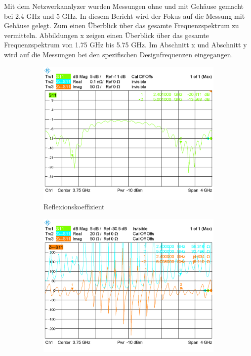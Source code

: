 Mit dem Netzwerkanalyzer wurden Messungen ohne und mit Gehäuse gemacht bei 2.4 GHz und 5 GHz. In diesem Bericht wird der Fokus  auf die Messung mit Gehäuse gelegt. Zum einen Überblick über das gesamte Frequenzspektrum zu vermitteln.
Abbildungen x zeigen einen Überblick über das gesamte Frequenzspektrum von 1.75 GHz bis 5.75 GHz.  Im Abschnitt x und Abschnitt y wird auf die Messungen bei den spezifischen Designfrequenzen eingegangen.

\begin{figure}[htbp]
	\begin{center}
		\begin{subfigure}[t]{0.49\textwidth}
			\begin{center}
				\includegraphics[width=1\textwidth]{../fig/plt/S11_WITH_FULL.PNG}
				\caption{Reflexionskoeffizient}
				\label{fig:S11_with_full}
			\end{center}
		\end{subfigure}
		\begin{subfigure}[t]{0.49\textwidth}
			\begin{center}
				\includegraphics[width=1\textwidth]{../fig/plt/IMP_WITH_FULL.PNG}

\end{center}
\end{subfigure}
\end{center}
\end{figure}
